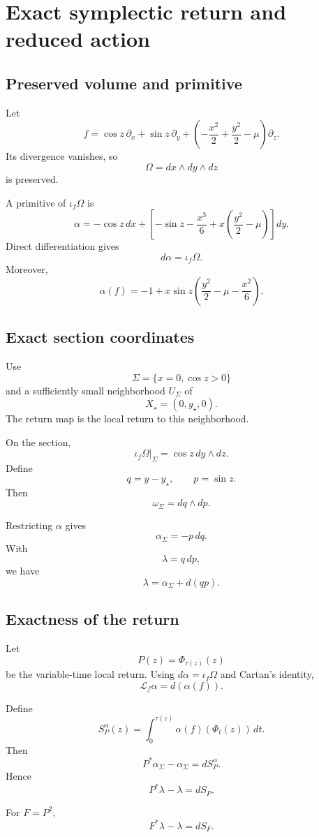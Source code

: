 \section{Exact symplectic return and reduced action}
\label{app:action}

\subsection{Preserved volume and primitive}

Let
\[
f
=
\cos z\,\partial_x
+
\sin z\,\partial_y
+
\left(
-\frac{x^2}{2}+\frac{y^2}{2}-\mu
\right)\partial_z.
\]
Its divergence vanishes, so
\[
\Omega=dx\wedge dy\wedge dz
\]
is preserved.

A primitive of \(\iota_f\Omega\) is
\[
\boxed{
\alpha
=
-\cos z\,dx+
\left[
-\sin z-\frac{x^3}{6}
+x\left(\frac{y^2}{2}-\mu\right)
\right]dy.
}
\]
Direct differentiation gives
\[
\boxed{
d\alpha=\iota_f\Omega.
}
\]
Moreover,
\[
\boxed{
\alpha(f)
=
-1+
x\sin z
\left(
\frac{y^2}{2}-\mu-\frac{x^2}{6}
\right).
}
\]

\subsection{Exact section coordinates}

Use
\[
\Sigma=\{x=0,\cos z>0\}
\]
and a sufficiently small neighborhood \(U_\Sigma\) of
\[
X_\star=(0,y_\star,0).
\]
The return map is the local return to this neighborhood.

On the section,
\[
\iota_f\Omega|_\Sigma
=
\cos z\,dy\wedge dz.
\]
Define
\[
q=y-y_\star,\qquad
p=\sin z.
\]
Then
\[
\boxed{
\omega_\Sigma=dq\wedge dp.
}
\]

Restricting \(\alpha\) gives
\[
\alpha_\Sigma=-p\,dq.
\]
With
\[
\lambda=q\,dp,
\]
we have
\[
\boxed{
\lambda=\alpha_\Sigma+d(qp).
}
\]

\subsection{Exactness of the return}

Let
\[
P(z)=\Phi_{\tau(z)}(z)
\]
be the variable-time local return. Using \(d\alpha=\iota_f\Omega\) and Cartan's identity,
\[
\mathcal L_f\alpha=d(\alpha(f)).
\]

Define
\[
S_P^\alpha(z)
=
\int_0^{\tau(z)}
\alpha(f)(\Phi_t(z))\,dt.
\]
Then
\[
P^*\alpha_\Sigma-\alpha_\Sigma=dS_P^\alpha.
\]
Hence
\[
\boxed{
P^*\lambda-\lambda=dS_P.
}
\]

For \(F=P^2\),
\[
\boxed{
F^*\lambda-\lambda=dS_F.
}
\]


